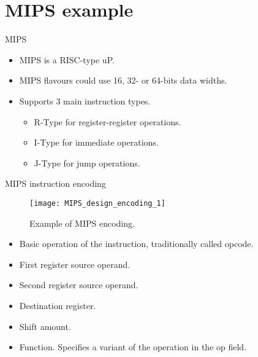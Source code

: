\documentclass[]{slides}
\begin{document}
\section{MIPS example}
\begin{frame}{\acs{MIPS}}{}
  \begin{itemize}
  \item \ac{MIPS} is a \ac{RISC}-type \ac{uP}.
  \item \ac{MIPS} flavours could use 16, 32- or 64-bits data widths.
  \item Supports 3 main instruction types.
    \begin{itemize}
    \item R-Type for register-register operations.
    \item I-Type for immediate operations.
    \item J-Type for jump operations.
    \end{itemize}
  \end{itemize}
\end{frame}

% 
\begin{frame}{\acs{MIPS} instruction encoding}
  \begin{figure}
  \centering
  \texttt{[image: MIPS\_design\_encoding\_1]}
  \caption{Example of \acs{MIPS} encoding.}
  \label{Figure:MIPS32_encoding_1}
  \end{figure}
    \begin{itemize}
  \item {} Basic operation of the instruction, traditionally called \alert{opcode}.
  \item {} First register source operand.
  \item {} Second register source operand.
  \item {} Destination register.
  \item {} Shift amount.
  \item {} Function. Specifies a variant of the operation in the op field.
  \end{itemize}
\end{frame}
\end{document}
